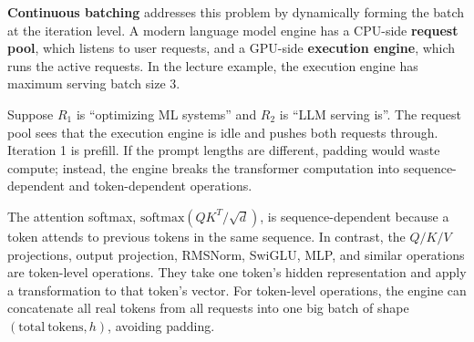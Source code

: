 \documentclass[twoside]{article}
\begin{document}
\textbf{Continuous batching} addresses this problem by dynamically forming the batch at the iteration level.  A modern language model engine has a CPU-side \textbf{request pool}, which listens to user requests, and a GPU-side \textbf{execution engine}, which runs the active requests.  In the lecture example, the execution engine has maximum serving batch size 3.

Suppose \(R_1\) is ``optimizing ML systems'' and \(R_2\) is ``LLM serving is''.  The request pool sees that the execution engine is idle and pushes both requests through.  Iteration 1 is prefill.  If the prompt lengths are different, padding would waste compute; instead, the engine breaks the transformer computation into sequence-dependent and token-dependent operations.

The attention softmax, \(\mathrm{softmax}(QK^T/\sqrt{d})\), is sequence-dependent because a token attends to previous tokens in the same sequence.  In contrast, the \(Q/K/V\) projections, output projection, RMSNorm, SwiGLU, MLP, and similar operations are token-level operations.  They take one token's hidden representation and apply a transformation to that token's vector.  For token-level operations, the engine can concatenate all real tokens from all requests into one big batch of shape \((\mathrm{total\ tokens}, h)\), avoiding padding.
\end{document}
